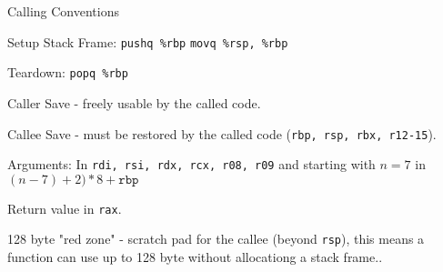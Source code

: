 Calling Conventions
\begin{compactitem}
	\item Setup Stack Frame: \texttt{pushq \%rbp} \quad \texttt{movq \%rsp, \%rbp}
	
	\item Teardown: \texttt{popq \%rbp}
		
	\item Caller Save - freely usable by the called code.
	
	\item Callee Save - must be restored by the called code (\texttt{rbp, rsp, rbx, r12-15}).
		
	\item Arguments: In \texttt{rdi, rsi, rdx, rcx, r08, r09} and starting with $n = 7$ in $(n-7) + 2) * 8 + \texttt{rbp}$
		
	\item Return value in \texttt{rax}.

	\item 128 byte "red zone" - scratch pad for the callee (beyond \texttt{rsp}), this means a function can use up to 128 byte without allocationg a stack frame..
\end{compactitem}
